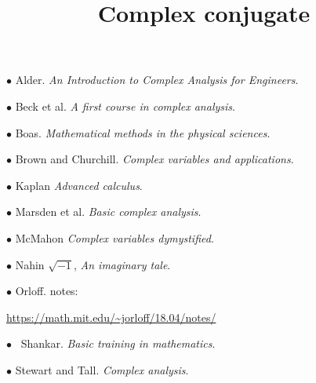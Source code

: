 \documentclass[11pt, oneside]{article}
\title{Complex conjugate}
\date{}
\begin{document}
\maketitle
\Large


$\bullet$ Alder.  \emph{An Introduction to Complex Analysis for Engineers}.

$\bullet$ Beck et al.  \emph{A first course in complex analysis}.

$\bullet$ Boas.  \emph{Mathematical methods in the physical sciences}.

$\bullet$ Brown and Churchill.  \emph{Complex variables and applications}.

$\bullet$ Kaplan  \emph{Advanced calculus}.

$\bullet$ Marsden et al.  \emph{Basic complex analysis}.

$\bullet$ McMahon  \emph{Complex variables dymystified}.

$\bullet$ Nahin  $\sqrt{-1}$, \emph{An imaginary tale}.

$\bullet$ Orloff.  notes:

\url{https://math.mit.edu/~jorloff/18.04/notes/}

$\bullet$ \ Shankar.  \emph{Basic training in mathematics}.

$\bullet$ Stewart and Tall.  \emph{Complex analysis}.
\end{document}
